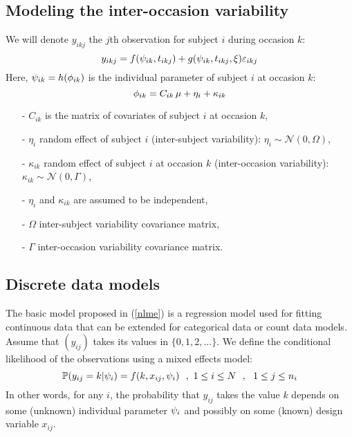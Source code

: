 
\subsection{Modeling the inter-occasion variability} \label{section_model_iov}

We will denote $y_{ikj}$ the $j$th observation for subject $i$ during occasion $k$:
\begin{equation}
y_{ikj}= f(\psi_{ik},t_{ikj})+g(\psi_{ik},t_{ikj},\xi)\varepsilon_{ikj}
\end{equation}
Here, $\psi_{ik}=h({\phi}_{ik})$ is the individual parameter of subject $i$ at occasion $k$:
\begin{equation}
\phig_{ik}=C_{ik} \, \fixed_effect +\eta_{i}+\kappa_{ik}
\end{equation}
\begin{itemize}
\item[-] $C_{ik}$ is the matrix of covariates of subject $i$ at occasion $k$,
\item[-] $\eta_i$ random effect of subject $i$ (inter-subject variability): $ \eta_i \sim \mathcal{N}(0,\Omega)$,
\item[-] $\kappa_{ik}$  random effect of subject $i$ at occasion $k$ (inter-occasion variability): $ \kappa_{ik} \sim \mathcal{N}(0,\Gamma)$,
\item[-] $\eta_i$ and $\kappa_{ik}$ are assumed to be independent,
\item[-] $\Omega$   inter-subject variability covariance matrix,
\item[-] $\Gamma$    inter-occasion variability covariance matrix.
\end{itemize}





\subsection{Discrete data models} \label{section_model_discrete}
The basic model proposed in (\ref{nlme}) is a regression model used for fitting continuous data that can be extended for  categorical data or count data models.
Assume that $(y_{ij})$ takes its values in $\{0, 1, 2,\ldots\}$. We define the conditional likelihood of the observations using a mixed effects model:
\begin{equation}
\label{discrete_nlme}
\Prob{y_{ij}=k | \psigi} = f(k,x_{ij},\psigi) \ \ , \ 1\leq i \leq N \ \ ,
\ \ 1 \leq j \leq n_i
\end{equation}
In other words, for any $i$, the probability that $y_{ij}$ takes the value $k$ depends on some (unknown) individual parameter ${\psi_i}$ and possibly on some (known) design variable $x_{ij}$.


